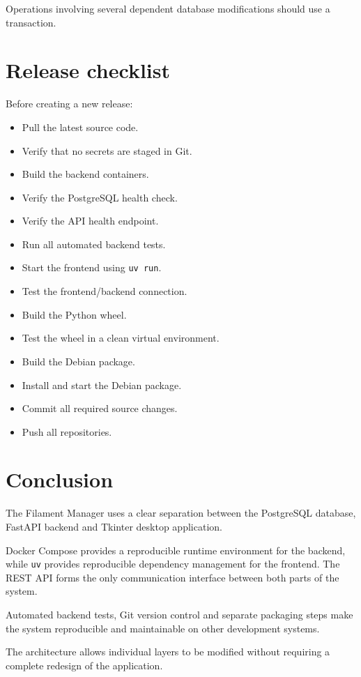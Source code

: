 \documentclass[a4paper,11pt]{article}
\begin{document}
Operations involving several dependent database modifications should use a
transaction.

\section{Release checklist}

Before creating a new release:

\begin{itemize}[label=$\square$]
  \item Pull the latest source code.
  \item Verify that no secrets are staged in Git.
  \item Build the backend containers.
  \item Verify the PostgreSQL health check.
  \item Verify the API health endpoint.
  \item Run all automated backend tests.
  \item Start the frontend using \texttt{uv run}.
  \item Test the frontend/backend connection.
  \item Build the Python wheel.
  \item Test the wheel in a clean virtual environment.
  \item Build the Debian package.
  \item Install and start the Debian package.
  \item Commit all required source changes.
  \item Push all repositories.
\end{itemize}

\section{Conclusion}

The Filament Manager uses a clear separation between the PostgreSQL database,
FastAPI backend and Tkinter desktop application.

Docker Compose provides a reproducible runtime environment for the backend,
while \texttt{uv} provides reproducible dependency management for the
frontend. The REST API forms the only communication interface between both
parts of the system.

Automated backend tests, Git version control and separate packaging steps make
the system reproducible and maintainable on other development systems.

The architecture allows individual layers to be modified without requiring a
complete redesign of the application.
\end{document}
